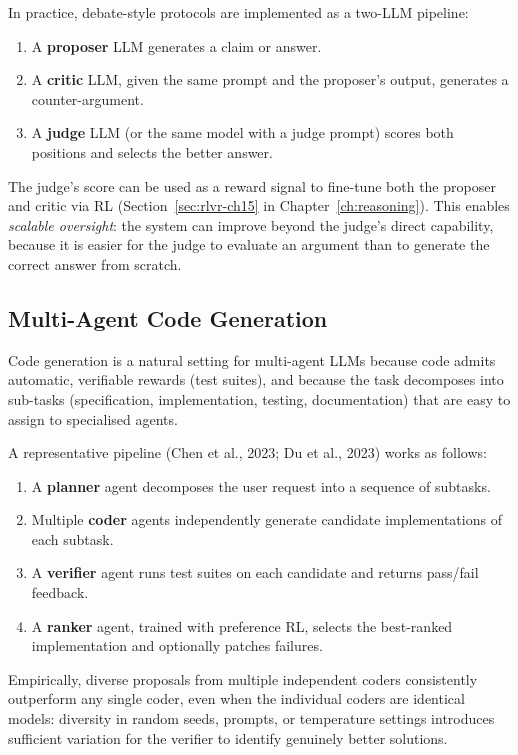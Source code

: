 In practice, debate-style protocols are implemented as a two-LLM
pipeline:
\begin{enumerate}[leftmargin=*]
  \item A \textbf{proposer} LLM generates a claim or answer.
  \item A \textbf{critic} LLM, given the same prompt and the
    proposer's output, generates a counter-argument.
  \item A \textbf{judge} LLM (or the same model with a judge prompt)
    scores both positions and selects the better answer.
\end{enumerate}
The judge's score can be used as a reward signal to fine-tune both
the proposer and critic via RL (Section~\ref{sec:rlvr-ch15} in
Chapter~\ref{ch:reasoning}). This enables \emph{scalable oversight}:
the system can improve beyond the judge's direct capability,
because it is easier for the judge to evaluate an argument than
to generate the correct answer from scratch.

\subsection{Multi-Agent Code Generation}

Code generation is a natural setting for multi-agent LLMs because
code admits automatic, verifiable rewards (test suites), and because
the task decomposes into sub-tasks (specification, implementation,
testing, documentation) that are easy to assign to specialised agents.

A representative pipeline (Chen et al., 2023; Du et al., 2023) works
as follows:
\begin{enumerate}[leftmargin=*]
  \item A \textbf{planner} agent decomposes the user request into a
    sequence of subtasks.
  \item Multiple \textbf{coder} agents independently generate
    candidate implementations of each subtask.
  \item A \textbf{verifier} agent runs test suites on each candidate
    and returns pass/fail feedback.
  \item A \textbf{ranker} agent, trained with preference RL, selects
    the best-ranked implementation and optionally patches failures.
\end{enumerate}
Empirically, diverse proposals from multiple independent coders
consistently outperform any single coder, even when the individual
coders are identical models: diversity in random seeds, prompts, or
temperature settings introduces sufficient variation for the verifier
to identify genuinely better solutions.

